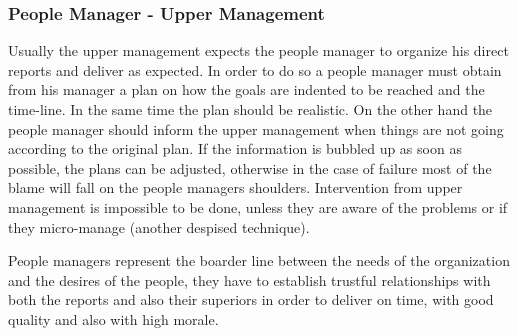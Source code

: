 \subsubsection{People Manager - Upper Management}
\label{sub-subsec:pmum}
Usually the upper management expects the people manager to organize his direct reports and deliver as expected. In order to do so a people manager must obtain from his manager a plan on how the goals are indented to be reached and the time-line. In the same time the plan should be realistic. On the other hand the people manager should inform the upper management when things are not going according to the original plan. If the information is bubbled up as soon as possible, the plans can be adjusted, otherwise in the case of failure most of the blame will fall on the people managers shoulders. Intervention from upper management is impossible to be done, unless they are aware of the problems or if they micro-manage (another despised technique).

People managers represent the boarder line between the needs of the organization and the desires of the people, they have to establish trustful relationships with both the reports and also their superiors in order to deliver on time, with good quality and also with high morale.

